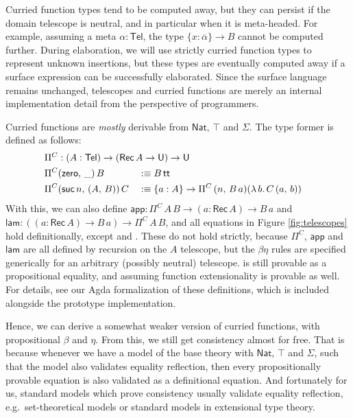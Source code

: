 \documentclass[acmsmall,review,anonymous,prologue,dvipsnames]{acmart}\settopmatter{printfolios=true,printccs=false,printacmref=false}
\renewcommand{\U}{\mathsf{U}}
\renewcommand{\tt}{\mathsf{tt}}
\newcommand{\Nat}{\mathsf{Nat}}
\newcommand{\zero}{\mathsf{zero}}
\newcommand{\suc}{\mathsf{suc}}
\newcommand{\Tel}{\mathsf{Tel}}
\newcommand{\Rec}{\mathsf{Rec}}
\newcommand{\ol}[1]{\overline{#1}}
\theoremstyle{remark}
\begin{document}
Curried function types tend to be computed away, but they can persist if the
domain telescope is neutral, and in particular when it is meta-headed. For
example, assuming a meta $\alpha : \Tel$, the type $\{x : \ol{\alpha}\}\to B$
cannot be computed further. During elaboration, we will use strictly curried
function types to represent unknown insertions, but these types are eventually
computed away if a surface expression can be successfully elaborated. Since the
surface language remains unchanged, telescopes and curried functions are merely
an internal implementation detail from the perspective of programmers.

Curried functions are \emph{mostly} derivable from $\Nat$, $\top$ and $\Sigma$.
The type former is defined as follows:
\begin{alignat*}{3}
& \rlap{$\Pi^C : (A : \Tel) \to (\Rec\,A \to \U) \to \U$}\\
& \Pi^C (\zero,\,\_)\,B && :\equiv B\,\tt\\
& \Pi^C (\suc\,n,\,(A,\,B))\,C && :\equiv \{a : A\}\to \Pi^C\,(n,\,B\,a) (\lambda\,b.\,C\,(a,\,b))
\end{alignat*}
With this, we can also define $\mathsf{app} : \Pi^C\,A\,B \to (a : \Rec\,A) \to
B\, a$ and $\mathsf{lam} : ((a : \Rec\,A) \to B\, a) \to \Pi^C\,A\,B$, and all
equations in Figure \ref{fig:telescopes} hold definitionally, except
 and . These do not hold
strictly, because $\Pi^C$, $\mathsf{app}$ and $\mathsf{lam}$ are all defined by
recursion on the $A$ telescope, but the $\beta\eta$ rules are specified
generically for an arbitrary (possibly neutral)
telescope.  is still provable as a propositional
equality, and assuming function extensionality  is
provable as well. For details, see our Agda formalization of these definitions,
which is included alongside the prototype implementation.

Hence, we can derive a somewhat weaker version of curried functions, with
propositional $\beta$ and $\eta$. From this, we still get consistency almost for
free. That is because whenever we have a model of the base theory with $\Nat$,
$\top$ and $\Sigma$, such that the model also validates equality reflection,
then every propositionally provable equation is also validated as a definitional
equation. And fortunately for us, standard models which prove consistency
usually validate equality reflection, e.g.\ set-theoretical models or standard
models in extensional type theory.
\end{document}
